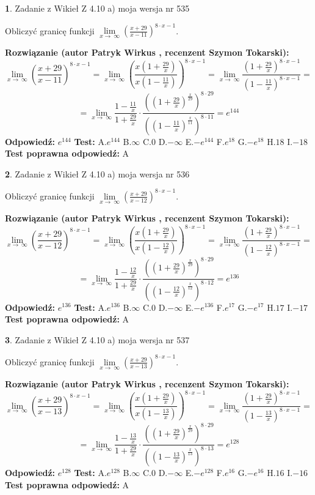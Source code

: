 \documentclass[12pt, a4paper]{article}
\theoremstyle{definition} %
\newtheorem{zad}{}
\newcommand{\zadStart}[1]{\begin{zad}#1\newline}
\newcommand{\zadStop}{\end{zad}}
\newcommand{\rozwStart}[2]{\noindent \textbf{Rozwiązanie (autor #1 , recenzent #2): }\newline}
\newcommand{\rozwStop}{\newline}
\newcommand{\odpStart}{\noindent \textbf{Odpowiedź:}\newline}
\newcommand{\odpStop}{\newline}
\newcommand{\testStart}{\noindent \textbf{Test:}\newline}
\newcommand{\testStop}{\newline}
\newcommand{\kluczStart}{\noindent \textbf{Test poprawna odpowiedź:}\newline}
\newcommand{\kluczStop}{\newline}
\begin{document}
\zadStart{Zadanie z Wikieł Z 4.10 a) moja wersja nr 535}

Obliczyć granicę funkcji  $\lim\limits_{x\to\ \infty}(\frac{x+29}{x-11})^{8\cdot x-1}$.
\zadStop
\rozwStart{Patryk Wirkus}{Szymon Tokarski}
$$\lim\limits_{x\to\ \infty}(\frac{x+29}{x-11})^{8\cdot x-1} = \lim\limits_{x\to\ \infty}(\frac{x(1+\frac{29}{x})}{x(1-\frac{11}{x})})^{8\cdot x-1}=\lim\limits_{x\to\ \infty}\frac{(1+\frac{29}{x})^{8\cdot x-1}}{(1-\frac{11}{x})^{8\cdot x-1}}=$$
$$=\lim\limits_{x\to\ \infty}\frac{1-\frac{11}{x}}{1+\frac{29}{x}}\cdot\frac{((1+\frac{29}{x})^{\frac{x}{29}})^{8\cdot29}}{((1-\frac{11}{x})^{\frac{x}{11}})^{8\cdot11}}=e^{144}$$
\rozwStop
\odpStart
$e^{144}$
\odpStop
\testStart
A.$e^{144}$ B.$\infty$ C.$0$ D.$-\infty$ E.$-e^{144}$
F.$e^{18}$ G.$-e^{18}$
H.$18$
I.$-18$
\testStop
\kluczStart
A
\kluczStop



\zadStart{Zadanie z Wikieł Z 4.10 a) moja wersja nr 536}

Obliczyć granicę funkcji  $\lim\limits_{x\to\ \infty}(\frac{x+29}{x-12})^{8\cdot x-1}$.
\zadStop
\rozwStart{Patryk Wirkus}{Szymon Tokarski}
$$\lim\limits_{x\to\ \infty}(\frac{x+29}{x-12})^{8\cdot x-1} = \lim\limits_{x\to\ \infty}(\frac{x(1+\frac{29}{x})}{x(1-\frac{12}{x})})^{8\cdot x-1}=\lim\limits_{x\to\ \infty}\frac{(1+\frac{29}{x})^{8\cdot x-1}}{(1-\frac{12}{x})^{8\cdot x-1}}=$$
$$=\lim\limits_{x\to\ \infty}\frac{1-\frac{12}{x}}{1+\frac{29}{x}}\cdot\frac{((1+\frac{29}{x})^{\frac{x}{29}})^{8\cdot29}}{((1-\frac{12}{x})^{\frac{x}{12}})^{8\cdot12}}=e^{136}$$
\rozwStop
\odpStart
$e^{136}$
\odpStop
\testStart
A.$e^{136}$ B.$\infty$ C.$0$ D.$-\infty$ E.$-e^{136}$
F.$e^{17}$ G.$-e^{17}$
H.$17$
I.$-17$
\testStop
\kluczStart
A
\kluczStop



\zadStart{Zadanie z Wikieł Z 4.10 a) moja wersja nr 537}

Obliczyć granicę funkcji  $\lim\limits_{x\to\ \infty}(\frac{x+29}{x-13})^{8\cdot x-1}$.
\zadStop
\rozwStart{Patryk Wirkus}{Szymon Tokarski}
$$\lim\limits_{x\to\ \infty}(\frac{x+29}{x-13})^{8\cdot x-1} = \lim\limits_{x\to\ \infty}(\frac{x(1+\frac{29}{x})}{x(1-\frac{13}{x})})^{8\cdot x-1}=\lim\limits_{x\to\ \infty}\frac{(1+\frac{29}{x})^{8\cdot x-1}}{(1-\frac{13}{x})^{8\cdot x-1}}=$$
$$=\lim\limits_{x\to\ \infty}\frac{1-\frac{13}{x}}{1+\frac{29}{x}}\cdot\frac{((1+\frac{29}{x})^{\frac{x}{29}})^{8\cdot29}}{((1-\frac{13}{x})^{\frac{x}{13}})^{8\cdot13}}=e^{128}$$
\rozwStop
\odpStart
$e^{128}$
\odpStop
\testStart
A.$e^{128}$ B.$\infty$ C.$0$ D.$-\infty$ E.$-e^{128}$
F.$e^{16}$ G.$-e^{16}$
H.$16$
I.$-16$
\testStop
\kluczStart
A
\kluczStop
\end{document}
